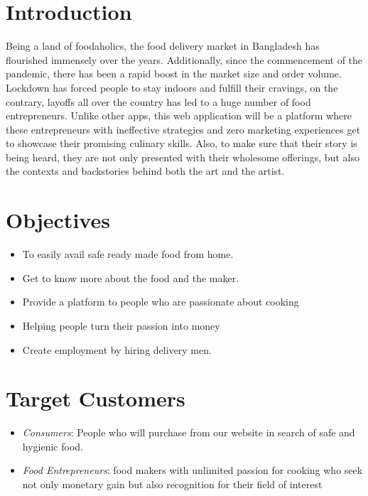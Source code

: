 \documentclass[12pt,a4paper]{article}
\begin{document}
\section*{Introduction} %
\label{sec:introduction}
Being a land of foodaholics, the food delivery market in Bangladesh has flourished immensely over the years. Additionally, since the commencement of the pandemic, there has been a rapid boost in the market size and order volume. Lockdown has forced people to stay indoors and fulfill their cravings, on the contrary, layoffs all over the country has led to a huge number of food entrepreneurs. Unlike other apps, this web application will be a platform where these entrepreneurs with ineffective strategies and zero marketing experiences get to showcase their promising culinary skills. Also, to make sure that their story is being heard, they are not only presented with their wholesome offerings, but also the contexts and backstories behind both the art and the artist.


\section*{Objectives} %
\label{sec:objectives}
\begin{itemize}
  \item To easily avail safe ready made food from home.
  \item Get to know more about the food and the maker.
  \item Provide a platform to people who are passionate about cooking
  \item Helping people turn their passion into money
  \item Create employment by hiring delivery men.
  
\end{itemize}

\section*{Target Customers} %
\label{sec:target_customers}
\begin{itemize}
  \item \emph{Consumers}:  People who will purchase from our website in search of safe and hygienic food.
  \item \emph{Food Entrepreneurs}: food makers with unlimited passion for cooking who seek not only monetary gain but also recognition for their field of interest

\end{itemize}
\end{document}
